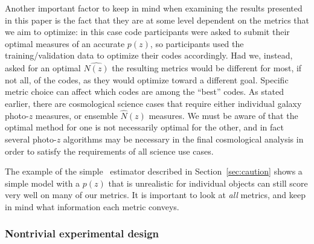 Another important factor to keep in mind when examining the results presented in this paper is the fact that they are at some level dependent on the metrics that we aim to optimize: in this case code participants were asked to submit their optimal measures of an accurate $p(z)$, so participants used the training/validation data to optimize their codes accordingly.
Had we, instead, asked for an optimal $\hat{N(z)}$ the resulting metrics would be different for most, if not all, of the codes, as they would optimize toward a different goal.
Specific metric choice can affect which codes are among the ``best'' codes.
As stated earlier, there are cosmological science cases that require either individual galaxy photo-$z$ measures, or ensemble $\hat{N}(z)$ measures.
We must be aware of that the optimal method for one is not necessarily optimal for the other, and in fact several photo-$z$ algorithms may be necessary in the final cosmological analysis in order to satisfy the requirements of all science use cases.

The example of the simple \trainz\ estimator described in Section~\ref{sec:caution} shows a simple model with a $p(z)$ that is unrealistic for individual objects can still score very well on many of our metrics.
It is important to look at {\it all} metrics, and keep in mind what information each metric conveys.

\subsubsection{Nontrivial experimental design}
\label{sec:futureexperiments}

